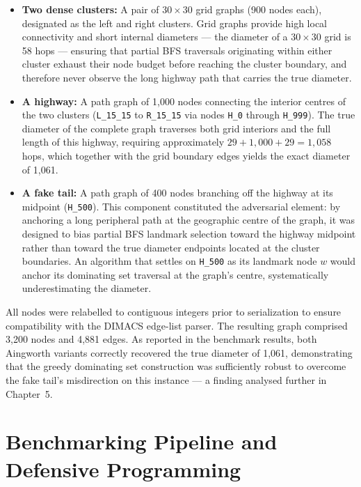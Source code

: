 \begin{itemize}
    \item \textbf{Two dense clusters:} A pair of $30 \times 30$ grid graphs (900 nodes each), designated as the left and right clusters. Grid graphs provide high local connectivity and short internal diameters — the diameter of a $30 \times 30$ grid is 58 hops — ensuring that partial BFS traversals originating within either cluster exhaust their node budget before reaching the cluster boundary, and therefore never observe the long highway path that carries the true diameter.
 
    \item \textbf{A highway:} A path graph of 1{,}000 nodes connecting the interior centres of the two clusters (\texttt{L\_15\_15} to \texttt{R\_15\_15} via nodes \texttt{H\_0} through \texttt{H\_999}). The true diameter of the complete graph traverses both grid interiors and the full length of this highway, requiring approximately $29 + 1{,}000 + 29 = 1{,}058$ hops, which together with the grid boundary edges yields the exact diameter of 1{,}061.
 
    \item \textbf{A fake tail:} A path graph of 400 nodes branching off the highway at its midpoint (\texttt{H\_500}). This component constituted the adversarial element: by anchoring a long peripheral path at the geographic centre of the graph, it was designed to bias partial BFS landmark selection toward the highway midpoint rather than toward the true diameter endpoints located at the cluster boundaries. An algorithm that settles on \texttt{H\_500} as its landmark node $w$ would anchor its dominating set traversal at the graph's centre, systematically underestimating the diameter.
\end{itemize}
 
All nodes were relabelled to contiguous integers prior to serialization to ensure compatibility with the DIMACS edge-list parser. The resulting graph comprised 3{,}200 nodes and 4{,}881 edges. As reported in the benchmark results, both Aingworth variants correctly recovered the true diameter of 1{,}061, demonstrating that the greedy dominating set construction was sufficiently robust to overcome the fake tail's misdirection on this instance — a finding analysed further in Chapter~5.

\section{Benchmarking Pipeline and Defensive Programming}

